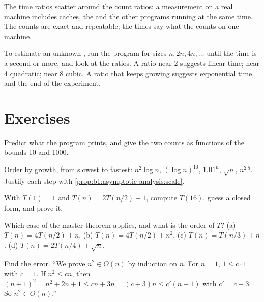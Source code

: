 The time ratios scatter around the count ratios: a measurement on a real machine includes caches, the 
and the other programs running at the same time. The counts are exact and repeatable; the times say what the counts
 on one machine.

\begin{inpractice}
To estimate an unknown , run the program for sizes $n, 2n, 4n, \dots$ until the time is a second or more, and look
at the ratios. A ratio near 2 suggests linear time; near 4 quadratic; near 8 cubic. A ratio that keeps growing suggests
exponential time, and the end of the experiment.
\end{inpractice}

\section{Exercises}\label{sec:b1:asymptotic-analysis:exercises}

\begin{exercise}[$\star$]\label{exo:b1:asymptotic-analysis:1}
Predict what the program prints, and give the two counts as functions of the bounds 10 and 1000.
\end{exercise}

\begin{exercise}[$\star$]\label{exo:b1:asymptotic-analysis:2}
Order by growth, from slowest to fastest: $n^2 \log n$, $(\log n)^{10}$, $1.01^n$, $\sqrt{n}$, $n^{2.5}$. Justify each
step with \cref{prop:b1:asymptotic-analysis:scale}.
\end{exercise}

\begin{exercise}[$\star$]\label{exo:b1:asymptotic-analysis:3}
With $T(1) = 1$ and $T(n) = 2T(n/2) + 1$, compute $T(16)$, guess a closed form, and prove it.
\end{exercise}

\begin{exercise}[$\star$]\label{exo:b1:asymptotic-analysis:4}
Which case of the master theorem applies, and what is the order of $T$? (a) $T(n) = 4T(n/2) + n$. (b) $T(n) = 4T(n/2)
+ n^2$. (c) $T(n) = T(n/3) + n$. (d) $T(n) = 2T(n/4) + \sqrt{n}$.
\end{exercise}

\begin{exercise}[$\star\star$]\label{exo:b1:asymptotic-analysis:5}
Find the error. ``We prove $n^2 \in O(n)$ by induction on $n$. For $n = 1$, $1 \leq c \cdot 1$ with $c = 1$. If $n^2
\leq c n$, then $(n + 1)^2 = n^2 + 2n + 1 \leq cn + 3n = (c + 3)n \leq c'(n + 1)$ with $c' = c + 3$. So $n^2 \in O(n)$.''
\end{exercise}

